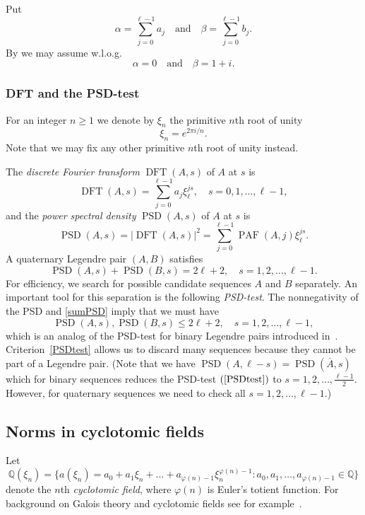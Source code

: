 \documentclass{article}
\theoremstyle{definition}
\newcommand{\PAF}{\operatorname{PAF}}
\newcommand{\DFT}{\operatorname{DFT}}
\newcommand{\PSD}{\operatorname{PSD}}
\begin{document}
Put
$$\alpha=\sum_{j=0}^{\ell-1}a_j \quad \mbox{and} \quad  \beta=\sum_{j=0}^{\ell-1}b_j.$$
By \cite[Lemma~1]{kw24} we may assume w.l.o.g.\ 
\begin{equation}\label{balance}\alpha=0\quad \mbox{and}\quad \beta=1+i.
\end{equation}

\subsubsection*{DFT and the PSD-test}

For an integer $n\ge 1$ we denote by $\xi_n$ the primitive $n$th root of unity 
$$\xi_n=e^{2\pi i/n}.$$
Note that we may fix any other primitive $n$th root of unity instead.

The {\em discrete Fourier transform} $\DFT(A,s)$ of $A$ at $s$
is
$$\DFT(A,s)=\sum_{j=0}^{\ell-1}a_j \xi_\ell^{js},\quad s=0,1,\ldots,\ell-1,$$
and the {\em power spectral density} $\PSD(A,s)$ of $A$ at $s$ is
$$\PSD(A,s)=|\DFT(A,s)|^2=\sum_{j=0}^{\ell-1}\PAF(A,j)\xi_\ell^{js}.$$
A quaternary Legendre pair $(A,B)$ satisfies
\begin{equation}\label{sumPSD}
  \PSD(A,s)+\PSD(B,s)=2\ell +2,\quad s=1,2,\ldots,\ell-1.
\end{equation}
For efficiency, we search for possible candidate sequences $A$ and $B$ separately.
An important tool for this separation is the following {\em PSD-test}. %
The nonnegativity of the PSD and 
\eqref{sumPSD} imply that we must have
\begin{equation}\label{PSDtest}
\PSD(A,s),\PSD(B,s)\le 2\ell+2,\quad s=1,2,\ldots,\ell-1,
\end{equation}
which is an analog of the PSD-test for binary Legendre pairs introduced in~\cite{fgs01}. Criterion~\eqref{PSDtest} allows us to discard many sequences because they cannot be part of a Legendre pair.
(Note that we have $\PSD(A,\ell-s)=\PSD(\overline{A},s)$ which for binary sequences reduces the PSD-test $(\ref{PSDtest})$ to  $s=1,2,\ldots,\frac{\ell-1}2$. However, for quaternary sequences we need to check all $s=1,2,\ldots,\ell-1$.) 

\subsection{Norms in cyclotomic fields}

Let 
$$\mathbb{Q}(\xi_n)=\bigl\{a(\xi_n)=a_0+a_1\xi_n+\dots+a_{\varphi(n)-1}\xi_n^{\varphi(n)-1}: a_0,a_1,\dots,a_{\varphi(n)-1}\in \mathbb{Q}\bigr\}$$
denote the $n$th {\em cyclotomic field}, 
where $\varphi(n)$ is Euler's totient function.
For background on Galois theory and cyclotomic fields see for example~\cite{l06,w97}.
\end{document}
